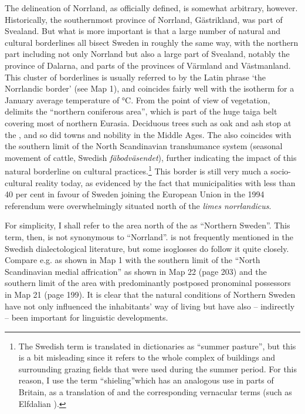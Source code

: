 The delineation of Norrland, as officially defined, is somewhat arbitrary, however. Historically, the southernmost province of Norrland, Gästrikland, was part of Svealand. But what is more important is that a large number of natural and cultural borderlines all bisect Sweden in roughly the same way, with the northern part including not only Norrland but also a large part of Svealand, notably the province of Dalarna, and parts of the provinces of Värmland and Västmanland. This cluster of borderlines is usually referred to by the Latin phrase  ‘the Norrlandic border’ (see Map 1), and coincides fairly well with the isotherm for a January average temperature of °C. From the point of view of vegetation,  delimits the “northern coniferous area”, which is part of the huge taiga belt covering most of northern Eurasia. Deciduous trees such as oak and ash stop at the , and so did towns and nobility in the Middle Ages. The  also coincides with the southern limit of the North Scandinavian transhumance system (seasonal movement of cattle, Swedish \textit{fäbodväsendet}), further indicating the impact of this natural borderline on cultural practices.\footnote{ The Swedish term is translated in dictionaries as “summer pasture”, but this is a bit misleading since it refers to the whole complex of buildings and surrounding grazing fields that were used during the summer period. For this reason, I use the term “shieling”\textstyleLinguisticExample{, }which has an analogous use in parts of Britain, as a translation of  and the corresponding vernacular terms (such as Elfdalian ).} This border is still very much a socio-cultural reality today, as evidenced by the fact that municipalities with less than 40 per cent in favour of Sweden joining the European Union in the 1994 referendum were overwhelmingly situated north of the \textit{limes norrlandicus}.

For simplicity, I shall refer to the area north of the  as “Northern Sweden”. This term, then, is not synonymous to “Norrland”.  is not frequently mentioned in the Swedish dialectological literature, but some isoglosses do follow it quite closely. Compare e.g.  as shown in Map 1 with the southern limit of the “North Scandinavian medial affrication” as shown in Map 22 (page 203) and the southern limit of the area with predominantly postposed pronominal possessors in Map 21 (page 199). It is clear that the natural conditions of Northern Sweden have not only influenced the inhabitants’ way of living but have also – indirectly – been important for linguistic developments.

